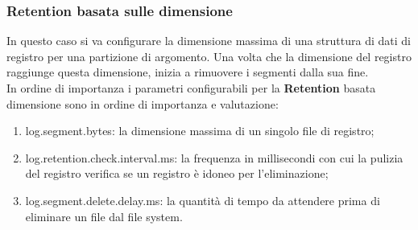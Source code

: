 \documentclass{article}
\begin{document}
\subsubsection{Retention basata sulle dimensione}
In questo caso si va 
configurare la dimensione massima di una struttura di dati di registro per una partizione di argomento. Una volta che la dimensione del registro raggiunge questa dimensione, inizia a rimuovere i segmenti dalla sua fine.
\\
In ordine di importanza i parametri configurabili per la    \textbf{Retention} basata dimensione sono in ordine di importanza e valutazione:
\begin{enumerate}
    \item log.segment.bytes: la dimensione massima di un singolo file di registro;
    \item log.retention.check.interval.ms: la frequenza in millisecondi con cui la pulizia del registro verifica se un registro è idoneo per l'eliminazione;
    \item log.segment.delete.delay.ms: la quantità di tempo da attendere prima di eliminare un file dal file system.
\end{enumerate}
\end{document}
